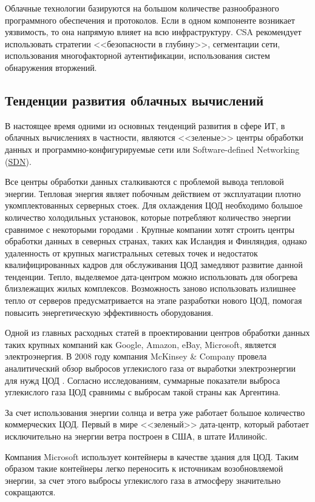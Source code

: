 Облачные технологии базируются на большом количестве разнообразного программного обеспечения и протоколов.
Если в одном компоненте возникает уязвимость, то она напрямую влияет на всю инфраструктуру.
CSA рекомендует использовать стратегии <<безопасности в глубину>>, сегментации сети, использования многофакторной аутентификации, использования систем обнаружения вторжений.

\subsection{Тенденции развития облачных вычислений}

В настоящее время одними из основных тенденций развития в сфере ИТ, в облачных вычислениях в частности, являются <<зеленые>> центры обработки данных и программно-конфигурируемые сети или Software-defined Networking (\hyperlink{sdn}{SDN}).

Все центры обработки данных сталкиваются с проблемой вывода тепловой энергии.
Тепловая энергия являет побочным действием от эксплуатации плотно укомплектованных серверных стоек.
Для охлаждения ЦОД необходимо большое количество холодильных установок, которые потребляют количество энергии сравнимое с некоторыми городами \cite{cnewsdc}.
Крупные компании хотят строить центры обработки данных в северных странах, таких как Исландия и Финляндия, однако удаленность от крупных магистральных сетевых точек и недостаток квалифицированных кадров для обслуживания ЦОД замедляют развитие данной тенденции.
Тепло, выделяемое дата-центром можно использовать для обогрева близлежащих жилых комплексов.
Возможность заново использовать излишнее тепло от серверов предусматривается на этапе разработки нового ЦОД, помогая повысить энергетическую эффективность оборудования.

Одной из главных расходных статей в проектировании центров обработки данных таких крупных компаний как Google, Amazon, eBay, Microsoft, является электроэнергия.
В 2008 году компания McKinsey \& Company провела аналитический обзор выбросов углекислого газа от выработки электроэнергии для нужд ЦОД \cite{greendc}.
Согласно исследованиям, суммарные показатели выброса углекислого газа ЦОД сравнимы с выбросам такой страны как Аргентина.

За счет использования энергии солнца и ветра уже работает большое количество коммерческих ЦОД.
Первый в мире <<зеленый>> дата-центр, который работает исключительно на энергии ветра построен в США, в штате Иллинойс.

Компания Microsoft использует контейнеры в качестве здания для ЦОД.
Таким образом такие контейнеры легко переносить к источникам возобновляемой энергии, за счет этого выбросы углекислого газа в атмосферу значительно сокращаются.

